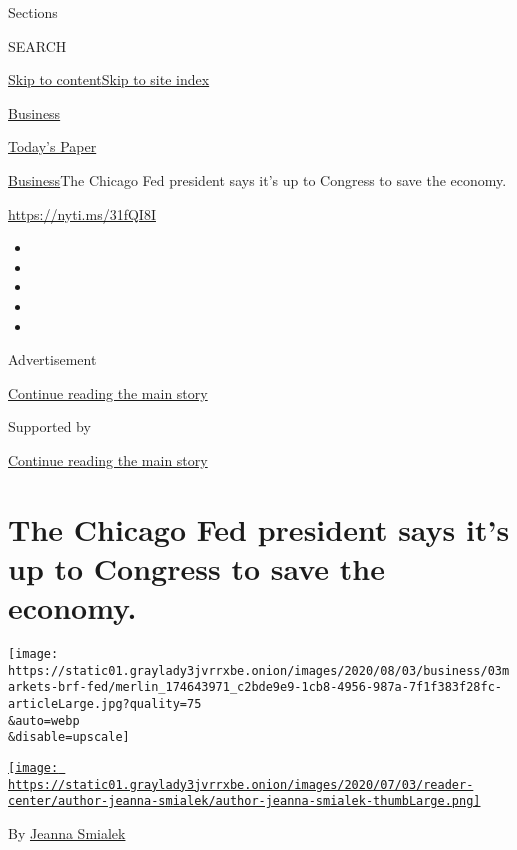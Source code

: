 Sections

SEARCH

\protect\hyperlink{site-content}{Skip to
content}\protect\hyperlink{site-index}{Skip to site index}

\href{https://www.nytimes3xbfgragh.onion/section/business}{Business}

\href{https://myaccount.nytimes3xbfgragh.onion/auth/login?response_type=cookie\&client_id=vi}{}

\href{https://www.nytimes3xbfgragh.onion/section/todayspaper}{Today's
Paper}

\href{/section/business}{Business}\textbar{}The Chicago Fed president
says it's up to Congress to save the economy.

\url{https://nyti.ms/31fQI8I}

\begin{itemize}
\item
\item
\item
\item
\item
\end{itemize}

Advertisement

\protect\hyperlink{after-top}{Continue reading the main story}

Supported by

\protect\hyperlink{after-sponsor}{Continue reading the main story}

\hypertarget{the-chicago-fed-president-says-its-up-to-congress-to-save-the-economy}{%
\section{The Chicago Fed president says it's up to Congress to save the
economy.}\label{the-chicago-fed-president-says-its-up-to-congress-to-save-the-economy}}

\texttt{[image: https://static01.graylady3jvrrxbe.onion/images/2020/08/03/business/03markets-brf-fed/merlin\_174643971\_c2bde9e9-1cb8-4956-987a-7f1f383f28fc-articleLarge.jpg?quality=75\\\&auto=webp\\\&disable=upscale]}

\href{https://www.nytimes3xbfgragh.onion/by/jeanna-smialek}{\texttt{[image: https://static01.graylady3jvrrxbe.onion/images/2020/07/03/reader-center/author-jeanna-smialek/author-jeanna-smialek-thumbLarge.png]}}

By \href{https://www.nytimes3xbfgragh.onion/by/jeanna-smialek}{Jeanna
Smialek}

